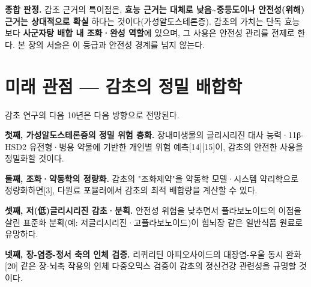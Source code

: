 \documentclass[11pt,oneside]{book}
\begin{document}
\vspace{2pt}\vspace{3pt}

\textbf{종합 판정.} 감초 근거의 특이점은, \textbf{효능 근거는 대체로 낮음\textasciitilde{}중등도이나 안전성(위해) 근거는 상대적으로 확실} 하다는 것이다(가성알도스테론증). 감초의 가치는 단독 효능보다 \textbf{사군자탕 배합 내 조화·완성 역할}에 있으며, 그 사용은 안전성 관리를 전제로 한다. 본 장의 서술은 이 등급과 안전성 경계를 넘지 않는다.

\section{미래 관점 — 감초의 정밀 배합학}
감초 연구의 다음 10년은 다음 방향으로 전망된다.

\textbf{첫째, 가성알도스테론증의 정밀 위험 층화.} 장내미생물의 글리시리진 대사 능력·11β-HSD2 유전형·병용 약물에 기반한 개인별 위험 예측[14][15]이, 감초의 안전한 사용을 정밀화할 것이다.

\textbf{둘째, 조화·약동학의 정량화.} 감초의 "조화제약"을 약동학 모델·시스템 약리학으로 정량화하면[3], 다원료 포뮬러에서 감초의 최적 배합량을 계산할 수 있다.

\textbf{셋째, 저(低)글리시리진 감초·분획.} 안전성 위험을 낮추면서 플라보노이드의 이점을 살린 표준화 분획(예: 저글리시리진·고플라보노이드)이 힘뇌장 같은 일반식품 원료로 유망하다.

\textbf{넷째, 장-염증-정서 축의 인체 검증.} 리퀴리틴 아피오사이드의 대장염-우울 동시 완화[20] 같은 장-뇌축 작용의 인체 다중오믹스 검증이 감초의 정신건강 관련성을 규명할 것이다.
\end{document}
